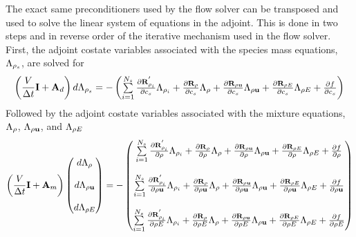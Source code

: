 The exact same preconditioners used by the flow solver can be transposed and
used to solve the linear system of equations in the adjoint.  This is done in
two steps and in reverse order of the iterative mechanism used in the flow
solver. First, the adjoint costate variables associated with the species mass
equations, $\Lambda_{\rho_s}$, are solved for
\begin{equation}
  \left( \frac{V}{\Delta t} \mi + \ma_d \right) d \adjlam{\rho_s}
  = -
  \begin{pmatrix}
    \lsum{i=1}{N_s}{\rlpprod{\rho_i}{c_s}} 
    + \rlprod{\rho}{c_s}
    + \rlprod{\rho \vu}{c_s}
    + \rlprod{\rho E}{c_s}
    + \pd{f}{c_s}
  \end{pmatrix}
  \label{dc-solve-adj}
\end{equation}
Followed by the adjoint costate variables associated with the mixture equations,
$\Lambda_{\rho}$, $\Lambda_{\rho \mathbf u}$, and $\Lambda_{\rho E}$
\begin{equation}
  \left( \frac{V}{\Delta t} \mi + \ma_m \right) 
  \begin{pmatrix}
    d \adjlam{\rho}     \\ \\
    d \adjlam{\rho \vu} \\ \\
    d \adjlam{\rho E}
  \end{pmatrix}
  = -
  \begin{pmatrix}
    \lsum{i=1}{N_s}{\rlpprod{\rho_i}{\rho}} + \rlprod{\rho}{\rho} + \rlprod{\rho \vu}{\rho} + \rlprod{\rho E}{\rho} + \pd{f}{\rho} \\ \\
    \lsum{i=1}{N_s}{\rlpprod{\rho_i}{\rho \vu}} + \rlprod{\rho}{\rho \vu} + \rlprod{\rho \vu}{\rho \vu} + \rlprod{\rho E}{\rho \vu} + \pd{f}{\rho \vu} \\ \\
    \lsum{i=1}{N_s}{\rlpprod{\rho_i}{\rho E}} + \rlprod{\rho}{\rho E} + \rlprod{\rho \vu}{\rho E} + \rlprod{\rho E}{\rho E} + \pd{f}{\rho E}
  \end{pmatrix}
  \label{mean-solve-adj}
\end{equation}

